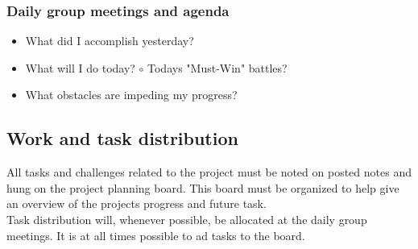 \subsubsection{Daily group meetings and agenda}
\begin{itemize}
\item What did I accomplish yesterday?
\item What will I do today?
\subitem $\circ$ Todays "Must-Win" battles?
\item What obstacles are impeding my progress?
\end{itemize}
\subsection{Work and task distribution}
All tasks and challenges related to the project must be noted on posted notes and hung on the project planning board. This board must be organized to help give an overview of the projects progress and future task.\\
Task distribution will, whenever possible, be allocated at the daily group meetings. It is at all times possible to ad tasks to the board.\\
\subsection{}
